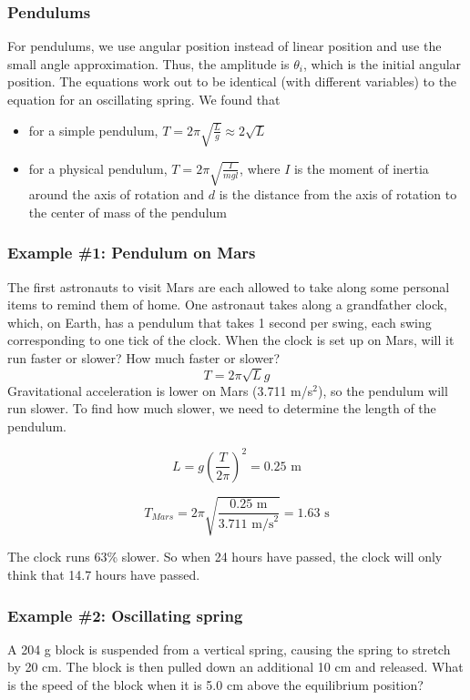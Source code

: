 \subsubsection{Pendulums}
For pendulums, we use angular position instead of linear position and use the small angle approximation. Thus, the amplitude is $\theta_i$, which is the initial angular position. The equations work out to be identical (with different variables) to the equation for an oscillating spring. We found that
\begin{itemize}
\item for a simple pendulum, $T=2\pi\sqrt{\frac{L}{g}}\approx 2\sqrt{L}$
\item for a physical pendulum, $T=2\pi\sqrt{\frac{I}{mgl}}$, where $I$ is the moment of inertia around the axis of rotation and $d$ is the distance from the axis of rotation to the center of mass of the pendulum
\end{itemize}

\subsubsection{Example \#1: Pendulum on Mars}
The first astronauts to visit Mars are each allowed to take along some personal items to remind them of home. One astronaut takes along a grandfather clock, which, on Earth, has a pendulum that takes 1 second per swing, each swing corresponding to one tick of the clock. When the clock is set up on Mars, will it run faster or slower? How much faster or slower?
$$T=2\pi\sqrt{L}{g}$$
Gravitational acceleration is lower on Mars (3.711 m/s$^2$), so the pendulum will run slower. To find how much slower, we need to determine the length of the pendulum.

$$L = g\left(\frac{T}{2\pi}\right)^2 = 0.25\mbox{ m}$$

$$T_{Mars} = 2\pi\sqrt{\frac{0.25\mbox{ m}}{3.711\mbox{ m/s}^2}} = 1.63\mbox{ s}$$

The clock runs 63\% slower. So when 24 hours have passed, the clock will only think that 14.7 hours have passed.


\subsubsection{Example \#2: Oscillating spring}
 A 204 g block is suspended from a vertical spring, causing the spring to stretch by 20 cm. The block is then pulled down an additional 10 cm and released. What is the speed of the block when it is 5.0 cm above the equilibrium position?

